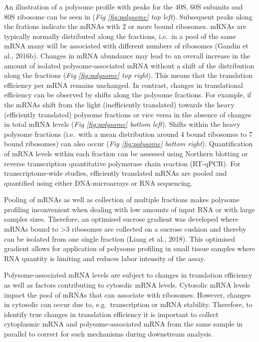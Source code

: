 \documentclass[12pt,openany]{book}
\begin{document}
An illustration of a polysome profile with peaks for the 40S, 60S
subunits and 80S ribosome can be seen in (\emph{Fig \ref{fig:polysome}
top left}). Subsequent peaks along the frations indicate the mRNAs with
2 or more bound ribosomes. mRNAs are typically normally distributed
along the fractions, i.e.~in a pool of the same mRNA many will be
associated with different numbers of ribosomes (Gandin et al., 2016b).
Changes in mRNA abundance may lead to an overall increase in the amount
of isolated polysome-associated mRNA without a shift of the distribution
along the fractions (\emph{Fig \ref{fig:polysome} top right}). This
means that the translation efficiency per mRNA remains unchanged. In
contrast, changes in translational efficiency can be observed by shifts
along the polysome fractions. For example, if the mRNAs shift from the
light (inefficiently translated) towards the heavy (efficiently
translated) polysome fractions or vice versa in the absence of changes
in total mRNA levels (\emph{Fig \ref{fig:polysome} bottom left}). Shifts
within the heavy polysome fractions (i.e.~with a mean distribution
around 4 bound ribosomes to 7 bound ribosomes) can also occur (\emph{Fig
\ref{fig:polysome} bottom right}). Quantification of mRNA levels within
each fraction can be assessed using Northern blotting or reverse
transcription quantitative polymerase chain reaction (RT-qPCR). For
transcriptome-wide studies, efficiently translated mRNAs are pooled and
quantified using either DNA-microarrays or RNA sequencing.

Pooling of mRNAs as well as collection of multiple fractions makes
polysome profiling inconvenient when dealing with low amounts of input
RNA or with large samples sizes. Therefore, an optimised sucrose
gradient was developed where mRNAs bound to \textgreater{}3 ribosomes
are collected on a sucrose cushion and thereby can be isolated from one
single fraction (Liang et al., 2018). This optimised gradient allows for
application of polysome profiling in small tissue samples where RNA
quantity is limiting and reduces labor intensity of the assay.

Polysome-associated mRNA levels are subject to changes in translation
efficiency as well as factors contributing to cytosolic mRNA levels.
Cytosolic mRNA levels impact the pool of mRNAs that can associate with
ribosomes. However, changes in cytosolic can occur due to,
e.g.~transcription or mRNA stability. Therefore, to identify true
changes in translation efficiency it is important to collect cytoplasmic
mRNA and polysome-associated mRNA from the same sample in parallel to
correct for such mechanisms during downstream analysis.
\end{document}
